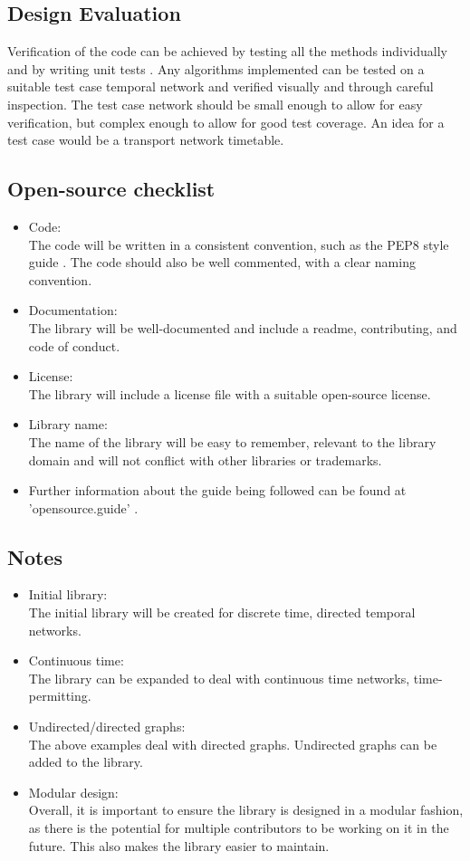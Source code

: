 \begin{design}
\subsection{Design Evaluation}
Verification of the code can be achieved by testing all the methods individually and by writing unit tests \cite{unittest}. Any algorithms implemented can be tested on a suitable test case temporal network and verified visually and through careful inspection. The test case network should be small enough to allow for easy verification, but complex enough to allow for good test coverage. An idea for a test case would be a transport network timetable.
\subsection{Open-source checklist}
\begin{itemize}
  \item Code:\\
  The code will be written in a consistent convention, such as the PEP8 style guide \cite{pep8}. The code should also be well commented, with a clear naming convention.
  \item Documentation:\\
  The library will be well-documented and include a readme, contributing, and code of conduct.
  \item License:\\
  The library will include a license file with a suitable open-source license.
  \item Library name:\\
  The name of the library will be easy to remember, relevant to the library domain and will not conflict with other libraries or trademarks.
  \item Further information about the guide being followed can be found at 'opensource.guide' \cite{open_source}.
\end{itemize}
\subsection{Notes}
\begin{itemize}
  \item Initial library:\\
  The initial library will be created for discrete time, directed temporal networks.
  \item Continuous time:\\
  The library can be expanded to deal with continuous time networks, time-permitting.
  \item Undirected/directed graphs:\\
  The above examples deal with directed graphs. Undirected graphs can be added to the library.
  \item Modular design:\\
  Overall, it is important to ensure the library is designed in a modular fashion, as there is the potential for multiple contributors to be working on it in the future. This also makes the library easier to maintain.
\end{itemize}
\end{design}
\clearpage